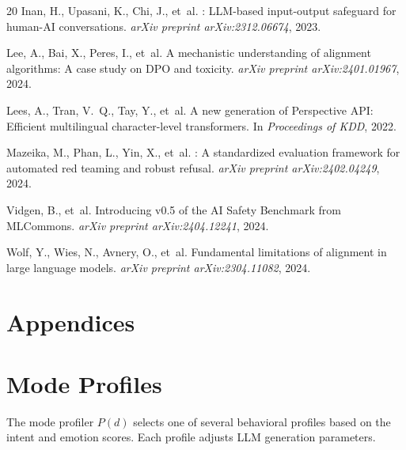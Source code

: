 \documentclass[11pt]{article}
\begin{document}
\begin{thebibliography}{20}
Inan, H., Upasani, K., Chi, J., et~al.
: {LLM}-based input-output safeguard for human-{AI} conversations.
\newblock \emph{arXiv preprint arXiv:2312.06674}, 2023.

Lee, A., Bai, X., Peres, I., et~al.
\newblock A mechanistic understanding of alignment algorithms: A case study on {DPO} and toxicity.
\newblock \emph{arXiv preprint arXiv:2401.01967}, 2024.

Lees, A., Tran, V.~Q., Tay, Y., et~al.
\newblock A new generation of {Perspective API}: Efficient multilingual character-level transformers.
\newblock In \emph{Proceedings of KDD}, 2022.

Mazeika, M., Phan, L., Yin, X., et~al.
: A standardized evaluation framework for automated red teaming and robust refusal.
\newblock \emph{arXiv preprint arXiv:2402.04249}, 2024.

Vidgen, B., et~al.
\newblock Introducing v0.5 of the {AI} Safety Benchmark from {MLCommons}.
\newblock \emph{arXiv preprint arXiv:2404.12241}, 2024.

Wolf, Y., Wies, N., Avnery, O., et~al.
\newblock Fundamental limitations of alignment in large language models.
\newblock \emph{arXiv preprint arXiv:2304.11082}, 2024.
\end{thebibliography}

\clearpage
\appendix
\section*{Appendices}

\section{Mode Profiles}
\label{app:modes}

The mode profiler $P(d)$ selects one of several behavioral profiles based on the intent and emotion scores.
Each profile adjusts LLM generation parameters.
\end{document}
